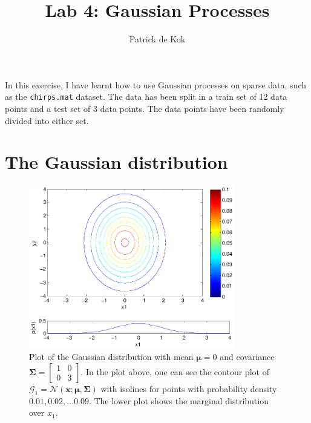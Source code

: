 \documentclass[a4paper,11pt]{article}
\title{Lab 4: Gaussian Processes}
\author{Patrick de Kok}
\newcommand{\V}[1]{\ensuremath{\boldsymbol{#1}}}
\newcommand{\mean}{\ensuremath{\boldsymbol{\mu}}}
\newcommand{\cov}{\ensuremath{\boldsymbol{\Sigma}}}
\newcommand{\npdf}{\ensuremath{\mathcal{N}}}
\begin{document}
\maketitle

In this exercise, I have learnt how to use Gaussian processes on sparse data, such as the \texttt{chirps.mat} dataset.  The data has been split in a train set of 12 data points and a test set of 3 data points.  The data points have been randomly divided into either set.


\section{The Gaussian distribution}
\begin{figure}
  \begin{center}
    \caption[Plot of the Gaussian distribution with covariance $\cov_{1,1} = 1, \cov_{2,2} = 3$.]{Plot of the Gaussian distribution with mean $\mean = 0$ and covariance $\cov = \begin{bmatrix}1 & 0\\0 & 3\end{bmatrix}$.  In the plot above, one can see the contour plot of $\mathcal G_1 = \npdf(\V{x} ; \mean, \cov)$ with isolines for points with probability density $0.01, 0.02, \ldots 0.09$.  The lower plot shows the marginal distribution over $x_1$.}
    \label{fig:plot1}
    \includegraphics[width=0.8\textwidth]{ex1plot1}
  \end{center}
\end{figure}
\end{document}
